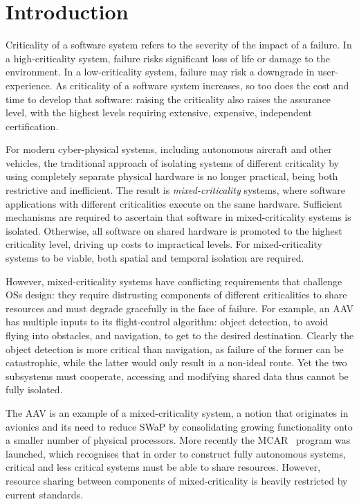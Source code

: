 \chapter{Introduction}

Criticality of a software system refers to the severity of the impact of a failure.
In a high-criticality system, failure risks significant loss of life or damage to the environment.
In a low-criticality system, failure may risk a downgrade in user-experience.
As criticality of a software system increases, so too does the cost and time to develop that
software: raising the criticality also raises the assurance level, with the highest levels requiring
extensive, expensive, independent certification.

For modern cyber-physical systems, including autonomous aircraft and other vehicles, the traditional
approach of isolating systems of different criticality by using completely separate physical
hardware is no
longer practical, being both restrictive and inefficient.
The result is \emph{mixed-criticality} systems, where software applications with different criticalities
execute on the same hardware. Sufficient mechanisms are required to ascertain that software in
mixed-criticality systems is isolated. Otherwise, all software on shared hardware is
promoted
to the highest criticality level, driving up costs to impractical levels. For mixed-criticality
systems to be
viable, both spatial and temporal isolation are required.

However, mixed-criticality systems have conflicting requirements that challenge \glspl{OS} design:
they require distrusting components of different criticalities to share resources and must
degrade gracefully in the face of failure.  For example, an \gls{AAV} has multiple inputs to its
flight-control algorithm: object detection, to avoid flying into obstacles, and navigation, to get
to the desired destination.  Clearly the object detection is more critical than navigation, as
failure of the former can be catastrophic, while the latter would only result in a non-ideal route.
Yet the two subsystems must cooperate, accessing and modifying shared data thus cannot be fully
isolated.

The \gls{AAV} is an example of a mixed-criticality system, a notion that originates in avionics and its
need to reduce \gls{SWaP} by consolidating growing functionality onto a smaller
number of physical processors. More recently the
\gls{MCAR}~\citep{Barhorst_BBHPSSSSU_09} program was launched, which recognises that in order to
construct fully autonomous systems, critical and less critical systems must be able to share
resources. However, resource sharing between components of mixed-criticality is heavily restricted by current
standards.


